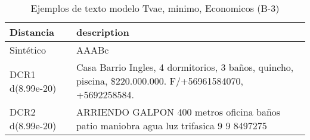 \begin{table}[H]
\centering
\fontsize{10}{14}\selectfont
\caption{Ejemplos de texto modelo Tvae, minimo, Economicos (B-3)}
\label{table-example-economicos-b-3-tvae-min-text}
\begin{tabular}{|l|m{35em}|}
\hline
\rowcolor[gray]{0.8}
Distancia & description \\
\hline Sintético & AAABc \\
\hline DCR1 d(8.99e-20) & Casa Barrio Ingles, 4 dormitorios, 3 ba\~nos, quincho, piscina, \$220.000.000. F/+56961584070, +5692258584. \\
\hline DCR2 d(8.99e-20) & ARRIENDO GALPON 400 metros oficina ba\~nos patio maniobra agua luz trifasica 9 9 8497275 \\
\hline
\end{tabular}
\end{table}
